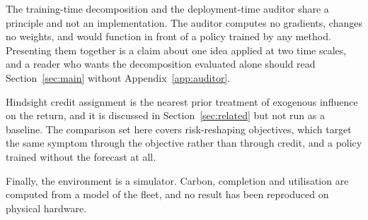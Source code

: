 The training-time decomposition and the deployment-time auditor share a principle and not an implementation. The auditor computes no gradients, changes no weights, and would function in front of a policy trained by any method. Presenting them together is a claim about one idea applied at two time scales, and a reader who wants the decomposition evaluated alone should read Section~\ref{sec:main} without Appendix~\ref{app:auditor}.

Hindsight credit assignment is the nearest prior treatment of exogenous influence on the return, and it is discussed in Section~\ref{sec:related} but not run as a baseline. The comparison set here covers risk-reshaping objectives, which target the same symptom through the objective rather than through credit, and a policy trained without the forecast at all.

Finally, the environment is a simulator. Carbon, completion and utilisation are computed from a model of the fleet, and no result has been reproduced on physical hardware.


